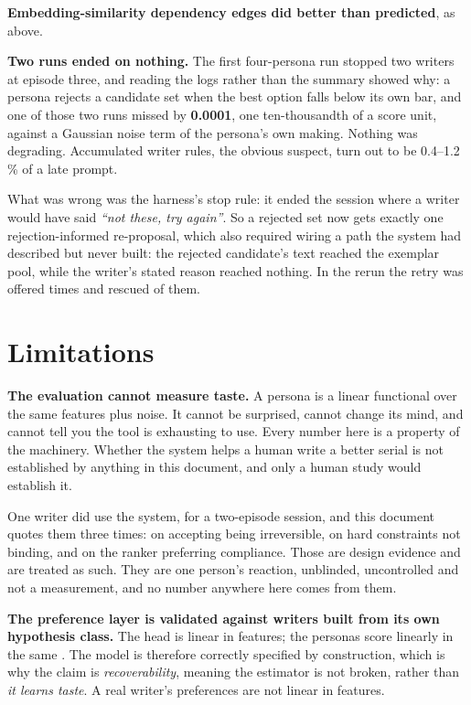 \documentclass{article}
\begin{document}
\textbf{Embedding-similarity dependency edges did better than predicted}, as above.

\textbf{Two runs ended on nothing.} The first four-persona run stopped two writers at
episode three, and reading the logs rather than the summary showed why: a persona rejects a
candidate set when the best option falls below its own bar, and one of those two runs missed
by \textbf{0.0001}, one ten-thousandth of a score unit, against a Gaussian noise term of
the persona's own making. Nothing was degrading. Accumulated writer rules, the obvious
suspect, turn out to be 0.4--1.2\,\% of a late prompt.

What was wrong was the harness's stop rule: it ended the session where a writer would have
said \emph{``not these, try again''}. So a rejected set now gets exactly one
rejection-informed re-proposal, which also required wiring a path the system had described
but never built: the rejected candidate's text reached the exemplar pool, while the writer's
stated reason reached nothing. In the rerun the retry was offered \rRetryOffered{} times and
rescued \rRetryRescued{} of them.



\section{Limitations}
\label{sec:limitations}

\textbf{The evaluation cannot measure taste.} A persona is a linear functional over the
same \rFeatures{} features plus noise. It cannot be surprised, cannot change its mind, and cannot tell you the
tool is exhausting to use. Every number here is a property of the machinery. Whether the
system helps a human write a better serial is not established by anything in this document,
and only a human study would establish it.

One writer did use the system, for a two-episode session, and this document quotes them
three times: on accepting being irreversible, on hard constraints not binding, and on the
ranker preferring compliance. Those are design evidence and are treated as such. They are
one person's reaction, unblinded, uncontrolled and not a measurement, and no number anywhere
here comes from them.

\textbf{The preference layer is validated against writers built from its own hypothesis
class.} The head is linear in \rFeatures{} features; the personas score linearly in the same
\rFeatures{}. The model is therefore correctly specified by construction, which is why the
claim is \emph{recoverability}, meaning the estimator is not broken, rather than \emph{it
learns taste}. A real writer's preferences are not linear in \rFeatures{} features.
\end{document}
